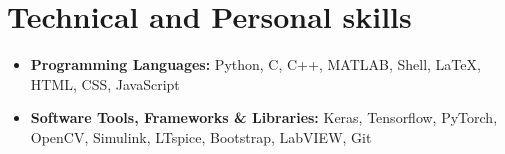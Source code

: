 \section{Technical and Personal skills}

\begin{itemize}
    
    \item \textbf{Programming Languages:} Python, C, C++, MATLAB, Shell, \LaTeX, HTML, CSS, JavaScript
          
    \item \textbf{Software Tools, Frameworks \& Libraries:} Keras,  Tensorflow, PyTorch, OpenCV, Simulink, LTspice, Bootstrap, LabVIEW, Git
          
\end{itemize}